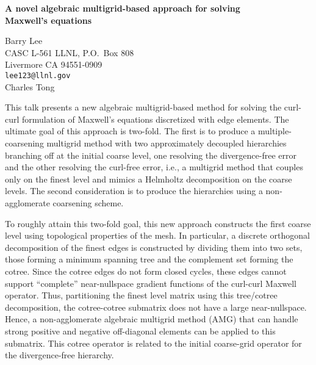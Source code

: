 \documentclass{report}
\begin{document}

\begin{center}
{\large
{\bf A novel algebraic multigrid-based approach for solving \\
	Maxwell's equations}}

	Barry Lee \\
	CASC L-561 LLNL, P.O.~Box 808 \\
	Livermore CA 94551-0909 \\
	{\tt lee123@llnl.gov} \\
	Charles Tong
\end{center}
This talk presents a new algebraic multigrid-based method
for solving the curl-curl formulation of Maxwell's equations
discretized with edge elements. The ultimate goal of this
approach is two-fold. The first is to produce a
multiple-coarsening multigrid method with two approximately
decoupled hierarchies branching off at the initial coarse
level, one resolving the divergence-free error and the other
resolving the curl-free error, i.e., a multigrid method that
couples only on the finest level and mimics a Helmholtz
decomposition on the coarse levels. The second consideration
is to produce the hierarchies using a non-agglomerate
coarsening scheme.

To roughly attain this two-fold goal,
this new approach constructs the first coarse level using
topological properties of the mesh. In particular, a
discrete orthogonal decomposition of the finest edges is
constructed by dividing them into two sets, those forming a
minimum spanning tree and the complement set forming the
cotree. Since the cotree edges do not form closed cycles,
these edges cannot support ``complete'' near-nullspace
gradient functions of the curl-curl Maxwell operator. Thus,
partitioning the finest level matrix using this tree/cotree
decomposition, the cotree-cotree submatrix does not have a
large near-nullspace. Hence, a non-agglomerate algebraic
multigrid method (AMG) that can handle strong positive and
negative off-diagonal elements can be applied to this
submatrix. This cotree operator is related to the initial
coarse-grid operator for the divergence-free hierarchy.
\end{document}
